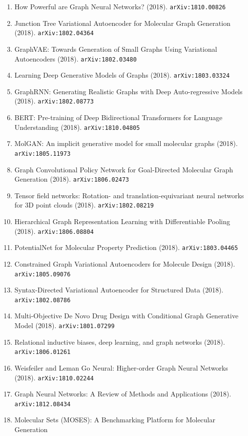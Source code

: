 \documentclass[11pt]{article}
\begin{document}
\begin{enumerate}
  \item How Powerful are Graph Neural Networks? (2018). \texttt{arXiv:1810.00826}
  \item Junction Tree Variational Autoencoder for Molecular Graph Generation (2018). \texttt{arXiv:1802.04364}
  \item GraphVAE: Towards Generation of Small Graphs Using Variational
  Autoencoders (2018). \texttt{arXiv:1802.03480}
  \item Learning Deep Generative Models of Graphs (2018). \texttt{arXiv:1803.03324}
  \item GraphRNN: Generating Realistic Graphs with Deep Auto-regressive Models (2018). \texttt{arXiv:1802.08773}
  \item BERT: Pre-training of Deep Bidirectional Transformers for Language
  Understanding (2018). \texttt{arXiv:1810.04805}
  \item MolGAN: An implicit generative model for small molecular graphs (2018). \texttt{arXiv:1805.11973}
  \item Graph Convolutional Policy Network for Goal-Directed Molecular Graph
  Generation (2018). \texttt{arXiv:1806.02473}
  \item Tensor field networks: Rotation- and translation-equivariant neural
  networks for 3D point clouds (2018). \texttt{arXiv:1802.08219}
  \item Hierarchical Graph Representation Learning with Differentiable Pooling (2018). \texttt{arXiv:1806.08804}
  \item PotentialNet for Molecular Property Prediction (2018). \texttt{arXiv:1803.04465}
  \item Constrained Graph Variational Autoencoders for Molecule Design (2018). \texttt{arXiv:1805.09076}
  \item Syntax-Directed Variational Autoencoder for Structured Data (2018). \texttt{arXiv:1802.08786}
  \item Multi-Objective De Novo Drug Design with Conditional Graph Generative
  Model (2018). \texttt{arXiv:1801.07299}
  \item Relational inductive biases, deep learning, and graph networks (2018). \texttt{arXiv:1806.01261}
  \item Weisfeiler and Leman Go Neural: Higher-order Graph Neural Networks (2018). \texttt{arXiv:1810.02244}
  \item Graph Neural Networks: A Review of Methods and Applications (2018). \texttt{arXiv:1812.08434}
  \item Molecular Sets (MOSES): A Benchmarking Platform for Molecular Generation

\end{enumerate}
\end{document}
